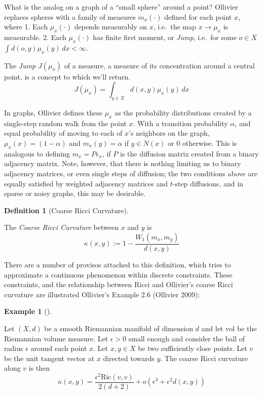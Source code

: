 \documentclass[
  letterpaper,
  DIV=11,
  numbers=noendperiod]{scrartcl}
\theoremstyle{plain}
\theoremstyle{plain}
\theoremstyle{definition}
\newtheorem{example}{Example}[section]
\theoremstyle{definition}
\newtheorem{definition}{Definition}[section]
\theoremstyle{remark}
\begin{document}
What is the analog on a graph of a ``small sphere'' around a point?
Ollivier replaces spheres with a family of measures \(m_{x}(\cdot)\)
defined for each point \(x\), where 1. Each \(\mu_{x}(\cdot)\) depends
measurably on \(x\), i.e.~the map \(x \to \mu_{x}\) is measurable. 2.
Each \(\mu_{x}(\cdot)\) has finite first moment, or \emph{Jump},
i.e.~for some \(o \in X\) \(\int d(o,y) \mu_{x}(y) \, dx < \infty\).

The \emph{Jump} \(J(\mu_{x})\) of a measure, a measure of its
concentration around a central point, is a concept to which we'll
return. \[
J(\mu_{x}) = \int_{y \in X} d(x, y) \mu_{x}(y) \, dx 
\]

In graphs, Ollivier defines these \(\mu_x\) as the probability
distributions created by a single-step random walk from the point \(x\).
With a transition probability \(\alpha\), and equal probability of
moving to each of \(x\)'s neighbors on the graph,
\(\mu_{x}(x) = (1-\alpha)\) and \(m_{x}(y) = \alpha\) if \(y \in N(x)\)
or \(0\) otherwise. This is analogous to defining \(m_{x} = P e_{x}\),
if \(P\) is the diffusion matrix created from a binary adjacency matrix.
Note, however, that there is nothing limiting us to binary adjacency
matrices, or even single steps of diffusion; the two conditions above
are equally satisfied by weighted adjacency matrices and \(t\)-step
diffusions, and in sparse or noisy graphs, this may be desirable.

\begin{definition}[Coarse Ricci
Curvature]\protect\hypertarget{def-coarse-ricci-curvature}{}\label{def-coarse-ricci-curvature}

The \emph{Coarse Ricci Curvature} between \(x\) and \(y\) is
\[\kappa(x, y):=1-\frac{W_1\left(m_x, m_y\right)}{d(x, y)}\]

\end{definition}

There are a number of provisos attached to this definition, which tries
to approximate a continuous phenomenon within discrete constraints.
These constraints, and the relationship between Ricci and Ollivier's
coarse Ricci curvature are illustrated Ollivier's Example 2.6 (Ollivier
2009):

\begin{example}[]\protect\hypertarget{exm-ollivier-example-2.6}{}\label{exm-ollivier-example-2.6}

Let \((X,d)\) be a smooth Riemannian manifold of dimension \(d\) and let
\(\text{vol}\) be the Riemannian volume measure. Let \(\epsilon>0\)
small enough and consider the ball of radius \(\epsilon\) around each
point \(x\). Let \(x,y \in X\) be two sufficiently close points. Let
\(v\) be the unit tangent vector at \(x\) directed towards \(y\). The
coarse Ricci curvature along \(v\) is then
\[\kappa(x,y) = \frac{\epsilon^2 \text{Ric}(v,v)}{2(d+2)}+o(\epsilon^3 + \epsilon^2d(x,y))\]

\end{example}
\end{document}

